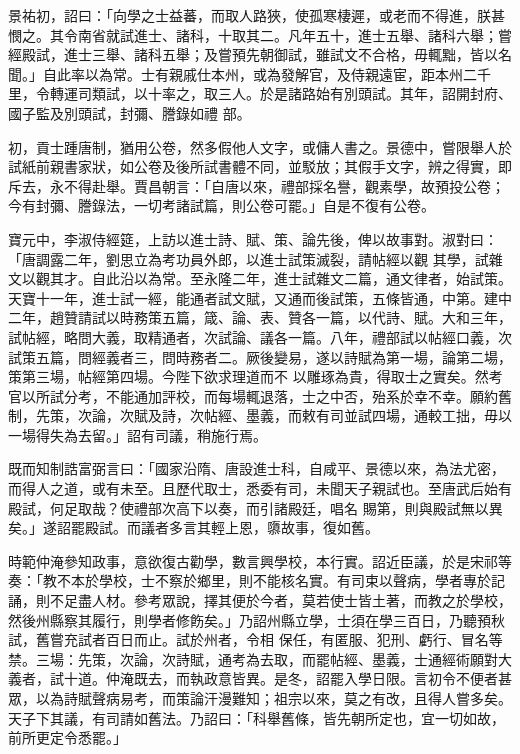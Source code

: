 \begin{pinyinscope}
 景祐初，詔曰：「向學之士益蕃，而取人路狹，使孤寒棲遲，或老而不得進，朕甚憫之。其令南省就試進士、諸科，十取其二。凡年五十，進士五舉、諸科六舉；嘗經殿試，進士三舉、諸科五舉；及嘗預先朝御試，雖試文不合格，毋輒黜，皆以名聞。」自此率以為常。士有親戚仕本州，或為發解官，及侍親遠宦，距本州二千里，令轉運司類試，以十率之，取三人。於是諸路始有別頭試。其年，詔開封府、國子監及別頭試，封彌、謄錄如禮
 部。



 初，貢士踵唐制，猶用公卷，然多假他人文字，或傭人書之。景德中，嘗限舉人於試紙前親書家狀，如公卷及後所試書體不同，並駁放；其假手文字，辨之得實，即斥去，永不得赴舉。賈昌朝言：「自唐以來，禮部採名譽，觀素學，故預投公卷；今有封彌、謄錄法，一切考諸試篇，則公卷可罷。」自是不復有公卷。



 寶元中，李淑侍經筵，上訪以進士詩、賦、策、論先後，俾以故事對。淑對曰：「唐調露二年，劉思立為考功員外郎，以進士試策滅裂，請帖經以觀
 其學，試雜文以觀其才。自此沿以為常。至永隆二年，進士試雜文二篇，通文律者，始試策。天寶十一年，進士試一經，能通者試文賦，又通而後試策，五條皆通，中第。建中二年，趙贊請試以時務策五篇，箴、論、表、贊各一篇，以代詩、賦。大和三年，試帖經，略問大義，取精通者，次試論、議各一篇。八年，禮部試以帖經口義，次試策五篇，問經義者三，問時務者二。厥後變易，遂以詩賦為第一場，論第二場，策第三場，帖經第四場。今陛下欲求理道而不
 以雕琢為貴，得取士之實矣。然考官以所試分考，不能通加評校，而每場輒退落，士之中否，殆系於幸不幸。願約舊制，先策，次論，次賦及詩，次帖經、墨義，而敕有司並試四場，通較工拙，毋以一場得失為去留。」詔有司議，稍施行焉。



 既而知制誥富弼言曰：「國家沿隋、唐設進士科，自咸平、景德以來，為法尤密，而得人之道，或有未至。且歷代取士，悉委有司，未聞天子親試也。至唐武后始有殿試，何足取哉？使禮部次高下以奏，而引諸殿廷，唱名
 賜第，則與殿試無以異矣。」遂詔罷殿試。而議者多言其輕上恩，隳故事，復如舊。



 時範仲淹參知政事，意欲復古勸學，數言興學校，本行實。詔近臣議，於是宋祁等奏：「教不本於學校，士不察於鄉里，則不能核名實。有司束以聲病，學者專於記誦，則不足盡人材。參考眾說，擇其便於今者，莫若使士皆土著，而教之於學校，然後州縣察其履行，則學者修飭矣。」乃詔州縣立學，士須在學三百日，乃聽預秋試，舊嘗充試者百日而止。試於州者，令相
 保任，有匿服、犯刑、虧行、冒名等禁。三場：先策，次論，次詩賦，通考為去取，而罷帖經、墨義，士通經術願對大義者，試十道。仲淹既去，而執政意皆異。是冬，詔罷入學日限。言初令不便者甚眾，以為詩賦聲病易考，而策論汗漫難知；祖宗以來，莫之有改，且得人嘗多矣。天子下其議，有司請如舊法。乃詔曰：「科舉舊條，皆先朝所定也，宜一切如故，前所更定令悉罷。」




\end{pinyinscope}

